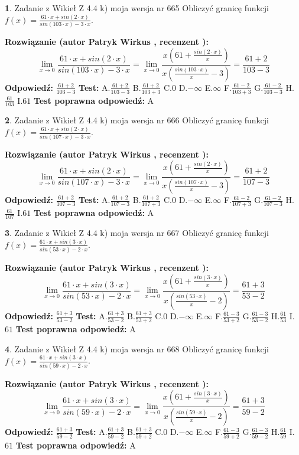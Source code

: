 \documentclass[12pt, a4paper]{article}
\theoremstyle{definition} %
\newtheorem{zad}{}
\newcommand{\zadStart}[1]{\begin{zad}#1\newline}
\newcommand{\zadStop}{\end{zad}}
\newcommand{\rozwStart}[2]{\noindent \textbf{Rozwiązanie (autor #1 , recenzent #2): }\newline}
\newcommand{\rozwStop}{\newline}
\newcommand{\odpStart}{\noindent \textbf{Odpowiedź:}\newline}
\newcommand{\odpStop}{\newline}
\newcommand{\testStart}{\noindent \textbf{Test:}\newline}
\newcommand{\testStop}{\newline}
\newcommand{\kluczStart}{\noindent \textbf{Test poprawna odpowiedź:}\newline}
\newcommand{\kluczStop}{\newline}
\begin{document}
\zadStart{Zadanie z Wikieł Z 4.4 k) moja wersja nr 665}
Obliczyć granicę funkcji $f(x)=\frac{61\cdot x +sin(2\cdot x)}{sin(103\cdot x) -3\cdot x}$.
\zadStop
\rozwStart{Patryk Wirkus}{}
$$\lim\limits_{x\to 0}\frac{61\cdot x +sin(2\cdot x)}{sin(103\cdot x) -3\cdot x}
=\lim\limits_{x\to 0}\frac{x(61+\frac{sin(2\cdot x)}{x})}{x(\frac{sin(103\cdot x)}{x}-3)}
=\frac{61+2}{103-3}$$
\rozwStop
\odpStart
$\frac{61+2}{103-3}$
\odpStop
\testStart
A.$\frac{61+2}{103-3}$
B.$\frac{61+2}{103+3}$
C.$0$
D.$-\infty$
E.$\infty$
F.$\frac{61-2}{103+3}$
G.$\frac{61-2}{103-3}$
H.$\frac{61}{103}$
I.$61$
\testStop
\kluczStart
A
\kluczStop



\zadStart{Zadanie z Wikieł Z 4.4 k) moja wersja nr 666}
Obliczyć granicę funkcji $f(x)=\frac{61\cdot x +sin(2\cdot x)}{sin(107\cdot x) -3\cdot x}$.
\zadStop
\rozwStart{Patryk Wirkus}{}
$$\lim\limits_{x\to 0}\frac{61\cdot x +sin(2\cdot x)}{sin(107\cdot x) -3\cdot x}
=\lim\limits_{x\to 0}\frac{x(61+\frac{sin(2\cdot x)}{x})}{x(\frac{sin(107\cdot x)}{x}-3)}
=\frac{61+2}{107-3}$$
\rozwStop
\odpStart
$\frac{61+2}{107-3}$
\odpStop
\testStart
A.$\frac{61+2}{107-3}$
B.$\frac{61+2}{107+3}$
C.$0$
D.$-\infty$
E.$\infty$
F.$\frac{61-2}{107+3}$
G.$\frac{61-2}{107-3}$
H.$\frac{61}{107}$
I.$61$
\testStop
\kluczStart
A
\kluczStop



\zadStart{Zadanie z Wikieł Z 4.4 k) moja wersja nr 667}
Obliczyć granicę funkcji $f(x)=\frac{61\cdot x +sin(3\cdot x)}{sin(53\cdot x) -2\cdot x}$.
\zadStop
\rozwStart{Patryk Wirkus}{}
$$\lim\limits_{x\to 0}\frac{61\cdot x +sin(3\cdot x)}{sin(53\cdot x) -2\cdot x}
=\lim\limits_{x\to 0}\frac{x(61+\frac{sin(3\cdot x)}{x})}{x(\frac{sin(53\cdot x)}{x}-2)}
=\frac{61+3}{53-2}$$
\rozwStop
\odpStart
$\frac{61+3}{53-2}$
\odpStop
\testStart
A.$\frac{61+3}{53-2}$
B.$\frac{61+3}{53+2}$
C.$0$
D.$-\infty$
E.$\infty$
F.$\frac{61-3}{53+2}$
G.$\frac{61-3}{53-2}$
H.$\frac{61}{53}$
I.$61$
\testStop
\kluczStart
A
\kluczStop



\zadStart{Zadanie z Wikieł Z 4.4 k) moja wersja nr 668}
Obliczyć granicę funkcji $f(x)=\frac{61\cdot x +sin(3\cdot x)}{sin(59\cdot x) -2\cdot x}$.
\zadStop
\rozwStart{Patryk Wirkus}{}
$$\lim\limits_{x\to 0}\frac{61\cdot x +sin(3\cdot x)}{sin(59\cdot x) -2\cdot x}
=\lim\limits_{x\to 0}\frac{x(61+\frac{sin(3\cdot x)}{x})}{x(\frac{sin(59\cdot x)}{x}-2)}
=\frac{61+3}{59-2}$$
\rozwStop
\odpStart
$\frac{61+3}{59-2}$
\odpStop
\testStart
A.$\frac{61+3}{59-2}$
B.$\frac{61+3}{59+2}$
C.$0$
D.$-\infty$
E.$\infty$
F.$\frac{61-3}{59+2}$
G.$\frac{61-3}{59-2}$
H.$\frac{61}{59}$
I.$61$
\testStop
\kluczStart
A
\kluczStop
\end{document}
